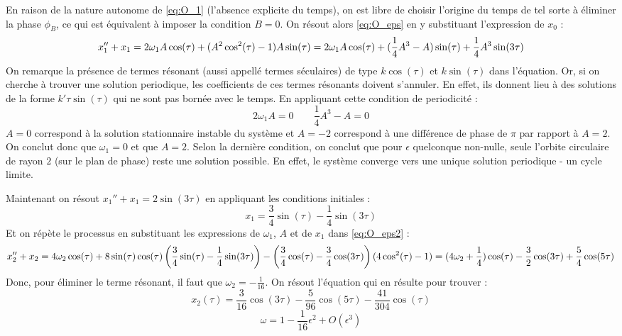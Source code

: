 %
En raison de la nature autonome de \eqref{eq:O_1} (l'absence explicite du temps), on est libre de choisir l'origine du temps de tel sorte à éliminer la phase $\phi_B$, 
ce qui est équivalent à imposer la condition $B = 0$. On résout alors \eqref{eq:O_eps} en y substituant l’expression de $x_0$ :
%
\begin{dmath}
    x_1'' + x_1 = 2\omega_1 A \cos(\tau) + (A^2 \cos^2(\tau) - 1)A\sin(\tau) \\
    = 2\omega_1 A \cos(\tau) + (\frac{1}{4}A^3 - A)\sin(\tau) + \frac{1}{4}A^3 \sin(3\tau)
\end{dmath}
%
On remarque la présence de termes résonant (aussi appellé termes séculaires) de type $k\cos(\tau)$ et $k\sin(\tau)$ dans l'équation. 
Or, si on cherche à trouver une solution periodique, les coefficients de ces termes résonants doivent s'annuler.
En effet, ils donnent lieu à des solutions de la forme $k'\tau \sin(\tau)$ qui ne sont pas bornée avec le temps.
En appliquant cette condition de periodicité :
%
\begin{equation}
    2\omega_1 A  = 0
    \qquad
    \frac{1}{4}A^3 - A = 0
\end{equation}
%
$A=0$ correspond à la solution stationnaire instable du système et $A=-2$ correspond à une différence de phase de $\pi$ par rapport à $A=2$. On conclut donc que $\omega_1 = 0$ et que $A=2$. 
Selon la dernière condition, on conclut que pour $\epsilon$ quelconque non-nulle, seule l'orbite circulaire de rayon $2$ (sur le plan de phase) reste une solution possible.
En effet, le système converge vers une unique solution periodique - un cycle limite.

Maintenant on résout $x_1'' + x_1 = 2\sin(3\tau)$ en appliquant les conditions initiales :
\begin{equation}
    x_1 = \frac{3}{4}\sin(\tau) - \frac{1}{4}\sin(3\tau)
\end{equation}
%
Et on répète le processus en substituant les expressions de $\omega_1$, $A$ et de $x_1$ dans \eqref{eq:O_eps2} :
%
\begin{dmath}
    x_2'' + x_2 = 4\omega_2\cos(\tau) + 8\sin(\tau)\cos(\tau)\left(\frac{3}{4}\sin(\tau) - \frac{1}{4}\sin(3\tau)\right) - \left(\frac{3}{4}\cos(\tau) - \frac{3}{4}\cos(3\tau)\right)(4\cos^2(\tau)-1) \\
    = (4\omega_2 + \frac{1}{4})\cos(\tau) - \frac{3}{2}\cos(3\tau) + \frac{5}{4}\cos(5\tau)
\end{dmath}
%
Donc, pour éliminer le terme résonant, il faut que $\omega_2 = -\frac{1}{16}$. On résout l'équation qui en résulte pour trouver :
%
\begin{equation}
    x_2(\tau) = \frac{3}{16}\cos(3\tau) - \frac{5}{96}\cos(5\tau) - \frac{41}{304}\cos(\tau)
\end{equation}
%
\begin{equation}
    \omega = 1 - \frac{1}{16}\epsilon^2 + O(\epsilon^3)
\end{equation}


